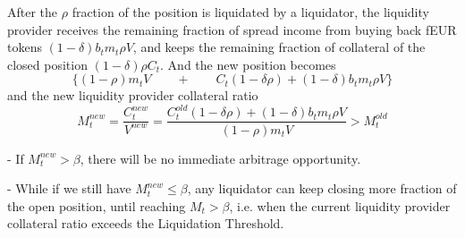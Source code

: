 \documentclass{article}
\begin{document}
\begin{itemize}
\begin{center}
\end{center}


\end{itemize}


After the $\rho$ fraction of the position is liquidated by a liquidator, the liquidity provider receives the remaining fraction of spread income from buying back fEUR tokens $(1-\delta)b_t m_t \rho V$, and keeps the remaining fraction of collateral of the closed position $(1-\delta) \rho C_t$. And the new position becomes 
$$\{(1-\rho)m_t V \quad \quad + \quad \quad C_t (1-\delta \rho) + (1-\delta)b_t m_t \rho V\}$$
and the new liquidity provider collateral ratio
$$M_t^{new}=\frac{C_t^{new}}{V^{new}} =\frac{C_t^{old}(1-\delta \rho) + (1-\delta)b_t m_t \rho V}{(1-\rho)m_t V}>M_t^{old}$$

- If $M_t^{new}>\beta$, there will be no immediate arbitrage opportunity. \par
- While if we still have $M_t^{new} \leq \beta$, any liquidator can keep closing more fraction of the open position, until reaching $M_t>\beta$, i.e. when the current liquidity provider collateral ratio exceeds the Liquidation Threshold.
\end{document}
